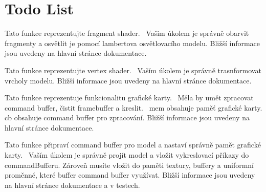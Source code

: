 \chapter{Todo List}
\hypertarget{todo}{}\label{todo}

\begin{DoxyRefList}
\item[Global \doxylink{prepareModel_8hpp_a8fd935a09a7659cb2858aca6d22d827c}{student\+\_\+draw\+Model\+\_\+fragment\+Shader} (\doxylink{structOutFragment}{Out\+Fragment} \&out\+Fragment, \doxylink{structInFragment}{In\+Fragment} const \&in\+Fragment, \doxylink{structShaderInterface}{Shader\+Interface} const \&si)]\label{todo__todo000004}%
%
Tato funkce reprezentujte fragment shader.~\newline
 Vašim úkolem je správně obarvit fragmenty a osvětlit je pomocí lambertova osvětlovacího modelu. Bližší informace jsou uvedeny na hlavní stránce dokumentace.  
\item[Global \doxylink{prepareModel_8hpp_a034552bbcfbd934b738aacf12ea64839}{student\+\_\+draw\+Model\+\_\+vertex\+Shader} (\doxylink{structOutVertex}{Out\+Vertex} \&out\+Vertex, \doxylink{structInVertex}{In\+Vertex} const \&in\+Vertex, \doxylink{structShaderInterface}{Shader\+Interface} const \&si)]\label{todo__todo000003}%
%
Tato funkce reprezentujte vertex shader.~\newline
 Vaším úkolem je správně trasnformovat vrcholy modelu. Bližší informace jsou uvedeny na hlavní stránce dokumentace.  
\item[Global \doxylink{studentSolution_2src_2studentSolution_2gpu_8hpp_acb235bf1bd34504bf58828aac4d40b11}{student\+\_\+\+GPU\+\_\+run} (\doxylink{structGPUMemory}{GPUMemory} \&mem, \doxylink{structCommandBuffer}{Command\+Buffer} const \&cb)]\label{todo__todo000001}%
%
Tato funkce reprezentuje funkcionalitu grafické karty.~\newline
 Měla by umět zpracovat command buffer, čistit framebuffer a kreslit.~\newline
 mem obsahuje paměť grafické karty. cb obsahuje command buffer pro zpracování. Bližší informace jsou uvedeny na hlavní stránce dokumentace. 
\item[Global \doxylink{prepareModel_8hpp_a46fe75e58d09064a5a33d511123d3a4d}{student\+\_\+prepare\+Model} (\doxylink{structGPUMemory}{GPUMemory} \&mem, \doxylink{structCommandBuffer}{Command\+Buffer} \&command\+Buffer, \doxylink{structModel}{Model} const \&model)]\label{todo__todo000002}%
%
Tato funkce připraví command buffer pro model a nastaví správně pamět grafické karty.~\newline
 Vaším úkolem je správně projít model a vložit vykreslovací příkazy do command\+Bufferu. Zároveň musíte vložit do paměti textury, buffery a uniformní proměnné, které buffer command buffer využívat. Bližší informace jsou uvedeny na hlavní stránce dokumentace a v testech. 
\end{DoxyRefList}